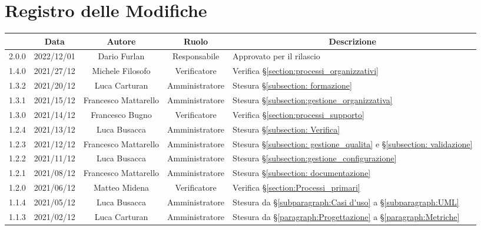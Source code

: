 \thispagestyle{empty}
\section*{Registro delle Modifiche}

\begin{center}
	\renewcommand{\arraystretch}{1.8}
	\begin{longtable}[c]{c | c | c | c | p{5cm}}
		\rowcolor[HTML]{125E28}
		\multicolumn{1}{c}{\color[HTML]{FFFFFF} \textbf{Versione}} & 
		\multicolumn{1}{c}{\color[HTML]{FFFFFF} \textbf{Data}} & 
		\multicolumn{1}{c}{\color[HTML]{FFFFFF} \textbf{Autore}} & 
		\multicolumn{1}{c}{\color[HTML]{FFFFFF} \textbf{Ruolo}} & 
		\multicolumn{1}{c}{\color[HTML]{FFFFFF} \textbf{Descrizione}} \\
		\endhead
		2.0.0 & 2022/12/01 & Dario Furlan & Responsabile & Approvato per il rilascio\\
		1.4.0 & 2021/27/12 & Michele Filosofo & Verificatore & Verifica §\ref{section:processi_organizzativi}\\
		1.3.2 & 2021/20/12 & Luca Carturan & Amministratore & Stesura §\ref{subsection: formazione}\\
		1.3.1 & 2021/15/12 & Francesco Mattarello & Amministratore & Stesura §\ref{subsection:gestione_organizzativa}\\
		1.3.0 & 2021/14/12 & Francesco Bugno & Verificatore & Verifica §\ref{section:processi_supporto}\\
		1.2.4 & 2021/13/12 & Luca Busacca & Amministratore & Stesura §\ref{subsection: Verifica}\\
		1.2.3 & 2021/12/12 & Francesco Mattarello & Amministratore & Stesura §\ref{subsection: gestione_qualita} e §\ref{subsection: validazione}\\
		1.2.2 & 2021/11/12 & Luca Busacca & Amministratore & Stesura  §\ref{subsection:gestione_configurazione} \\
		1.2.1 & 2021/08/12 & Francesco Mattarello & Amministratore & Stesura §\ref{subsection: documentazione}\\
		1.2.0 & 2021/06/12 & Matteo Midena & Verificatore & Verifica §\ref{section:Processi_primari} \\
		1.1.4 & 2021/05/12 & Luca Busacca & Amministratore & Stesura da  §\ref{subparagraph:Casi d'uso} a §\ref{subparagraph:UML} \\
		1.1.3 & 2021/02/12 & Luca Carturan & Amministratore & Stesura da  §\ref{paragraph:Progettazione} a §\ref{paragraph:Metriche} \\

\end{longtable}
\end{center}
